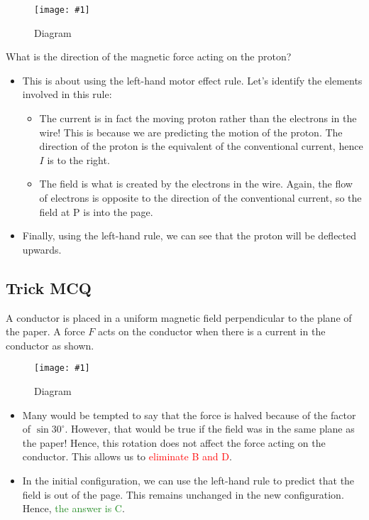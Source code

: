 \documentclass[a4paper,12pt]{article}
\newcommand{\degsym}{^{\circ}}
\newcommand{\img}[4]{\begin{center}
  \begin{figure}[H]
    \centering
    \texttt{[image: \#1]}
    \caption{#3}
    \label{fig:#4}
  \end{figure}
\end{center}}
\begin{document}
\img{ex/2.png}{0.4}{Diagram}{ex2}

What is the direction of the magnetic force acting on the proton?

\begin{itemize}
  \item This is about using the left-hand motor effect rule. Let's identify the elements involved in this rule:
        \begin{itemize}
          \item The current is in fact the moving proton rather than the electrons in the wire! This is because we are predicting the motion of the proton. The direction of the proton is the equivalent of the conventional current, hence $I$ is to the right.
          \item The field is what is created by the electrons in the wire. Again, the flow of electrons is opposite to the direction of the conventional current, so the field at P is into the page.
        \end{itemize}
  \item Finally, using the left-hand rule, we can see that the proton will be deflected upwards.
\end{itemize}

\pagebreak

\subsection{Trick MCQ}

A conductor is placed in a uniform magnetic field perpendicular to the plane of the paper. A force $F$ acts on the conductor when there is a current in the conductor as shown.

\img{ex/3.png}{0.8}{Diagram}{ex3}

\begin{itemize}
  \item Many would be tempted to say that the force is halved because of the factor of $\sin 30\degsym$. However, that would be true if the field was in the same plane as the paper! Hence, this rotation does not affect the force acting on the conductor. This allows us to \textcolor{red}{eliminate B and D}.
  \item In the initial configuration, we can use the left-hand rule to predict that the field is out of the page. This remains unchanged in the new configuration. Hence, \textcolor{ForestGreen}{the answer is C}.
\end{itemize}
\end{document}

